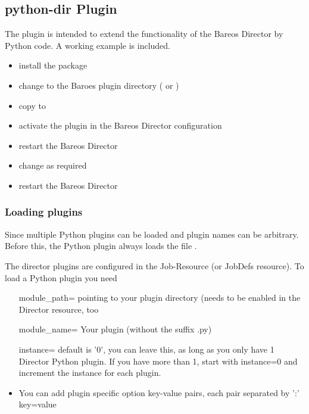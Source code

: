 \subsection{python-dir Plugin}
\label{director-python-plugin}

The  plugin is intended to extend the functionality of the Bareos Director by Python code.
A working example is included.

\begin{itemize}
    \item install the  package
    \item change to the Baroes plugin directory ( or )
    \item copy  to 
    \item activate the plugin in the Bareos Director configuration
    \item restart the Bareos Director
    \item change  as required
    \item restart the Bareos Director
\end{itemize}


\subsubsection{Loading plugins}

Since  multiple Python plugins can be loaded and plugin names can be arbitrary. Before this, the Python plugin always loads the file .

The director plugins are configured in the Job-Resource (or JobDefs resource). To load a Python plugin you need
\begin{itemize}
 \item [module\_path= ] pointing to your plugin directory (needs to be enabled in the Director resource, too
 \item [module\_name= ] Your plugin (without the suffix .py)
 \item [instance= ] default is '0', you can leave this, as long as you only have 1 Director Python plugin. If you have more than 1, start with instance=0 and increment the instance for each plugin.
 \item You can add plugin specific option key-value pairs, each pair separated by ':' key=value
\end{itemize}


